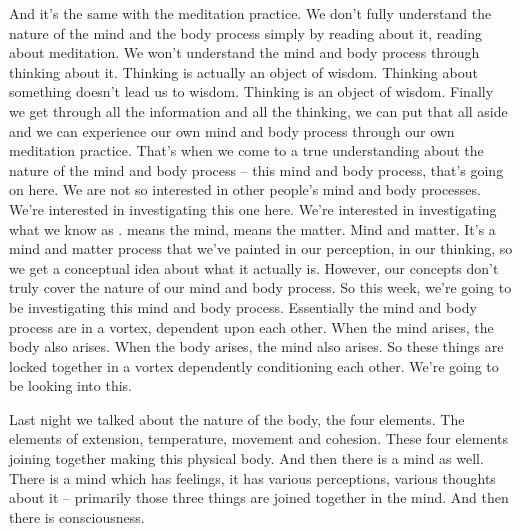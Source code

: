 \documentclass[letterpaper,10pt,english]{sphinxmanual}
\begin{document}
\sphinxAtStartPar
And it’s the same with the meditation practice. We don’t fully understand the nature of the mind and the body process simply by reading about
it, reading about meditation. We won’t understand the mind and body process  through  thinking  about  it.  Thinking  is  actually  an  object  of  wisdom.
Thinking about something doesn’t lead us to wisdom. Thinking is an object
of wisdom. Finally we get through all the information and all the thinking,
we  can  put  that  all  aside  and  we  can  experience  our  own  mind  and  body
process through our own meditation practice. That’s when we come to a true
understanding about the nature of the mind and body process – this mind and
body process, that’s going on here. We are not so interested in other people’s
mind  and  body  processes.  We’re  interested  in  investigating  this  one  here.
We’re interested in investigating what we know as
.
   means
the mind,
means the matter. Mind and matter. It’s a mind and matter
process that we’ve painted in our perception, in our thinking, so we get a
conceptual idea about what it actually is. However, our concepts don’t truly
cover the nature of our mind and body process. So this week, we’re going to
be investigating this mind and body process. Essentially the mind and body
process are in a vortex, dependent upon each other. When the mind arises,
the body also arises. When the body arises, the mind also arises. So these
things are locked together in a vortex dependently conditioning each other.
We’re going to be looking into this.

\sphinxAtStartPar
Last night we talked about the nature of the body, the four elements.
The  elements  of  extension,  temperature,  movement  and  cohesion.  These
four elements joining together making this physical body. And then there is a
mind as well. There is a mind which has feelings, it has various perceptions,
various thoughts about it – primarily those three things are joined together
in the mind. And then there is consciousness.
\end{document}
